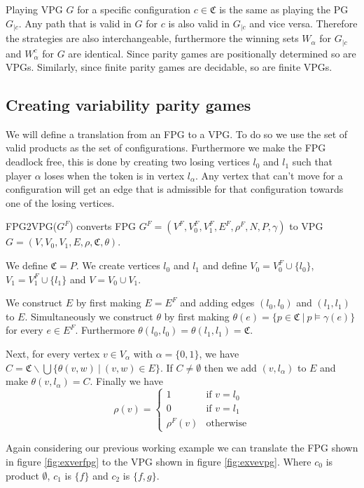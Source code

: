 Playing VPG $G$ for a specific configuration $c \in \mathfrak{C}$ is the same as playing the PG $G_{|c}$. Any path that is valid in $G$ for $c$ is also valid in $G_{|c}$ and vice versa. Therefore the strategies are also interchangeable, furthermore the winning sets $W_\alpha$ for $G_{|c}$ and $W_\alpha^c$ for $G$ are identical. Since parity games are positionally determined so are VPGs. Similarly, since finite parity games are decidable, so are finite VPGs.
\subsection{Creating variability parity games}
We will define a translation from an FPG to a VPG. To do so we use the set of valid products as the set of configurations. Furthermore we make the FPG deadlock free, this is done by creating two losing vertices $l_0$ and $l_1$ such that player $\alpha$ loses when the token is in vertex $l_\alpha$. Any vertex that can't move for a configuration will get an edge that is admissible for that configuration towards one of the losing vertices.
\begin{definition}
	\label{def_FPG2VPG}
	FPG2VPG($G^F$) converts FPG $G^F = (V^F, V_0^F, V_1^F, E^F, \rho^F, N, P, \gamma)$ to VPG $G = (V, V_0, V_1, E, \rho, \mathfrak{C}, \theta)$.
	
	We define $\mathfrak{C} = P$. We create vertices $l_0$ and $l_1$ and define $V_0 = V_0^F \cup \{l_0\}$, $V_1 = V_1^F \cup \{l_1\}$ and $V = V_0 \cup V_1$.
	
	We construct $E$ by first making $E = E^F$ and adding edges $(l_0, l_0)$ and $(l_1, l_1)$ to $E$. Simultaneously we construct $\theta$ by first making $\theta(e) = \{p \in \mathfrak{C}\ |\ p \models \gamma(e)\}$ for every $e \in E^F$. Furthermore $\theta(l_0,l_0) = \theta(l_1,l_1) = \mathfrak{C}$.
	
	Next, for every vertex $v \in V_\alpha$ with $\alpha = \{0,1\}$, we have $C = \mathfrak{C} \backslash \bigcup \{\theta(v,w)\ |\ (v,w) \in E\}$. If $C \neq \emptyset$ then we add $(v, l_\alpha)$ to $E$ and make $\theta(v,l_\alpha) = C$.
	Finally we have 
	\[ \rho(v) = \begin{cases}
	1  & \text{if } v = l_0 \\
	0 & \text{if } v = l_1 \\
	\rho^F(v) &\text{otherwise}
	\end{cases} \]
\end{definition}
Again considering our previous working example we can translate the FPG shown in figure \ref{fig:exverfpg} to the VPG shown in figure \ref{fig:exvevpg}. Where $c_0$ is product $\emptyset$, $c_1$ is $\{f\}$ and $c_2$ is $\{f,g\}$.

